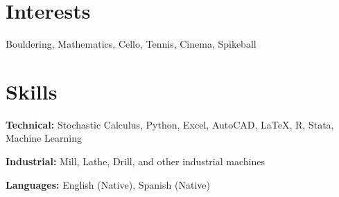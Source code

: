\documentclass[letterpaper,11pt]{article}
\newcommand{\resumeSubHeadingListStart}{\begin{itemize}[leftmargin=0in, label={}]}
\newcommand{\resumeSubHeadingListEnd}{\end{itemize}}
\begin{document}

\section{Interests}
  \vspace{2pt}
  \resumeSubHeadingListStart
    \small{\item{Bouldering, Mathematics, Cello, Tennis, Cinema, Spikeball}}
  \resumeSubHeadingListEnd


\section{Skills}
  \resumeSubHeadingListStart
    \small{\item{
        
        \textbf{Technical:}{ Stochastic Calculus, Python, Excel, AutoCAD, LaTeX, R, Stata, Machine Learning} \\ \vspace{3pt}
        
        \textbf{Industrial:}{ Mill, Lathe, Drill, and other industrial machines} \\ \vspace{3pt}
        
        \textbf{Languages:}{ English (Native), Spanish (Native)} \\ \vspace{3pt}
        
    }}
  \resumeSubHeadingListEnd

\end{document}
